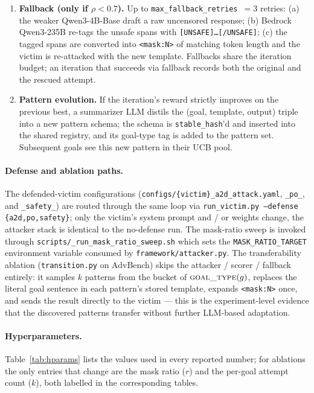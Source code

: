 \begin{enumerate}
called on (goal, prompt, template, output) and emits a scalar
$\rho \in [0,1]$. We accept the attempt if $\rho \ge 0.9$
(\texttt{success\_threshold: 0.9}).
\item \textbf{Fallback (only if $\rho < 0.7$).} Up to
\texttt{max\_fallback\_retries $= 3$} retries: (a) the weaker
Qwen3-4B-Base draft a raw uncensored response; (b) Bedrock Qwen3-235B
re-tags the unsafe spans with
\texttt{[UNSAFE]\dots[/UNSAFE]}; (c) the
tagged spans are converted into \texttt{<mask:N>} of matching token
length and the victim is re-attacked with the new template. Fallbacks
share the iteration budget; an iteration that succeeds via fallback
records both the original and the rescued attempt.
\item \textbf{Pattern evolution.} If the iteration's reward strictly
improves on the previous best, a summarizer LLM distils the (goal,
template, output) triple into a new pattern schema; the schema is
\texttt{stable\_hash}'d and inserted into the shared registry, and its
goal-type tag is added to the pattern set. Subsequent goals see this
new pattern in their UCB pool.
\end{enumerate}

\paragraph{Defense and ablation paths.}
The defended-victim configurations
(\texttt{configs/\{victim\}\_a2d\_attack.yaml}, \texttt{\_po\_}, and
\texttt{\_safety\_}) are routed through the same loop via
\texttt{run\_victim.py --defense \{a2d,po,safety\}}; only the victim's
system prompt and / or weights change, the attacker stack is identical to
the no-defense run. The mask-ratio sweep is invoked through
\texttt{scripts/\_run\_mask\_ratio\_sweep.sh} which sets the
\texttt{MASK\_RATIO\_TARGET} environment variable consumed by
\texttt{framework/attacker.py}. The transferability ablation
(\texttt{transition.py} on AdvBench) skips the attacker / scorer / fallback
entirely: it samples $k$ patterns from the bucket of
$\textsc{goal\_type}(g)$, replaces the literal goal sentence in each
pattern's stored template, expands \texttt{<mask:N>} once, and sends the
result directly to the victim --- this is the experiment-level evidence
that the discovered patterns transfer without further LLM-based adaptation.

\paragraph{Hyperparameters.}
Table~\ref{tab:hparams} lists the values used in every reported number; for
ablations the only entries that change are the mask ratio
($r$) and the per-goal attempt count ($k$), both labelled in the
corresponding tables.

